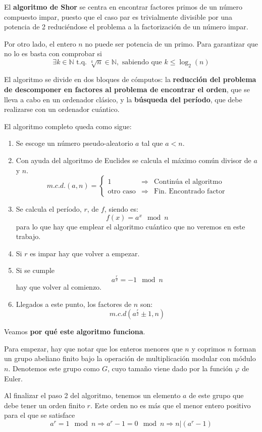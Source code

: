 \documentclass[nochap]{apuntesURJC}
\begin{document}
El \textbf{algoritmo de Shor} se centra en encontrar factores primos de un número compuesto impar, puesto que el caso par es trivialmente divisible por una potencia de 2 reduciéndose el problema a la factorización de un número impar.

Por otro lado, el entero $n$ no puede ser potencia de un primo. Para garantizar que no lo es basta con comprobar si
\[\exists k \in \mathbb{N} \text{ t.q. } \sqrt[k]{n} \in \mathbb{N}, \text{ sabiendo que } k\leq \log_2(n)\]

El algoritmo se divide en dos bloques de cómputos: la \textbf{reducción del problema de descomponer en factores al problema de encontrar el orden}, que se lleva a cabo en un ordenador clásico, y la \textbf{búsqueda del período}, que debe realizarse con un ordenador cuántico.

El algoritmo completo queda como sigue:
\begin{enumerate}
\item Se escoge un número pseudo-aleatorio $a$ tal que $a<n$.
\item Con ayuda del algoritmo de Euclides se calcula el máximo común divisor de $a$ y $n$.
\[m.c.d.(a,n) = \left\{ \begin{array}{lcl}
1 & \Rightarrow & \text{Continúa el algoritmo}\\
\text{otro caso} & \Rightarrow & \text{Fin. Encontrado factor}
\end{array}\right.\]
\item Se calcula el período, $r$, de $f$, siendo es:
\[f(x)=a^x \mod n\]
para lo que hay que emplear el algoritmo cuántico que no veremos en este trabajo.
\item Si $r$ es impar hay que volver a empezar.
\item Si se cumple
\[a^{\frac{r}{2}}=-1 \mod n\]
hay que volver al comienzo.
\item Llegados a este punto, los factores de $n$ son:
\[m.c.d\left(a^{\frac{r}{2}}\pm 1, n\right)\]
\end{enumerate}

Veamos \textbf{por qué este algoritmo funciona}.

Para empezar, hay que notar que los enteros menores que $n$ y coprimos $n$ forman un grupo abeliano finito bajo la operación de multiplicación modular con módulo $n$. Denotemos este grupo como $G$, cuyo tamaño viene dado por la función $\varphi$ de Euler.

Al finalizar el paso 2 del algoritmo, tenemos un elemento $a$ de este grupo que debe tener un orden finito $r$. Este orden no es más que el menor entero positivo para el que se satisface
\[a^r = 1 \mod n \Rightarrow a^r-1 = 0 \mod n \Rightarrow n|(a^r-1)\]
\end{document}
